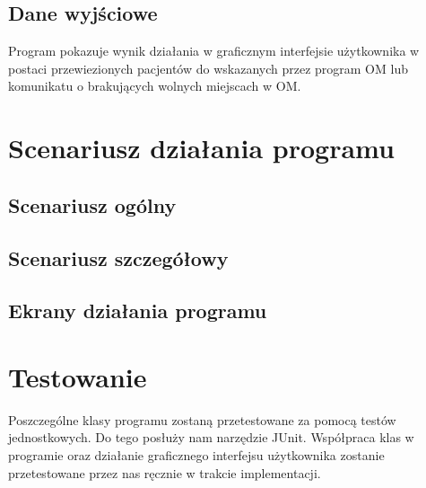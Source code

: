 \documentclass[]{article}
\begin{document}
    \subsection{Dane wyjściowe} %
    Program pokazuje wynik działania w graficznym interfejsie użytkownika w postaci przewiezionych pacjentów do wskazanych przez program OM lub komunikatu o brakujących wolnych miejscach w OM.


    \section{Scenariusz działania programu}

    \subsection{Scenariusz ogólny} %

    \subsection{Scenariusz szczegółowy} %

    \subsection{Ekrany działania programu} %


    \section{Testowanie}
    Poszczególne klasy programu zostaną przetestowane za pomocą testów jednostkowych. Do tego posłuży nam narzędzie JUnit. Współpraca klas w programie oraz działanie graficznego interfejsu użytkownika zostanie przetestowane przez nas ręcznie w trakcie implementacji.
\end{document}
